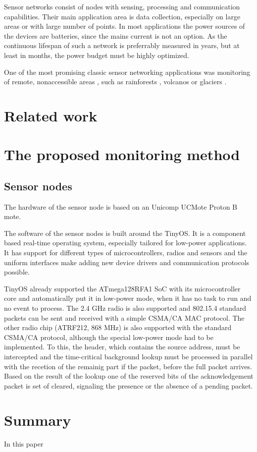 \documentclass[conference]{IEEEtran}
\begin{document}
Sensor networks consist of nodes with sensing, processing and communication
capabilities. Their main application area is data collection, especially
on large areas or with large number of points. In most applications
the power sources of the devices are batteries, since the mains current
is not an option. As the continuous lifespan of such a network is
preferrably measured in years, but at least in months, the power
budget must be highly optimized.

One of the most promising classic sensor networking applications was monitoring
of remote, nonaccessible areas \cite{corke2010}, such as rainforests
\cite{wark2008, cama2013}, volcanos \cite{werner2006, song2009} or glaciers \cite{martinez2004, martinez2005}. 

\section{Related work}

\section{The proposed monitoring method}

\subsection{Sensor nodes}

The hardware of the sensor node is based on an Unicomp UCMote Proton B mote.

The software of the sensor nodes is built around the TinyOS. It is a component
based real-time operating system, especially tailored for low-power applications.
It has support for different types of microcontrollers, radios and sensors and
the uniform interfaces make adding new device drivers and communication protocols possible.

TinyOS already supported the ATmega128RFA1 SoC with its microcontroller core and
automatically put it in low-power mode, when it has no task to run and no event
to process. The 2.4 GHz radio is also supported and 802.15.4 standard packets can
be sent and received with a simple CSMA/CA MAC protocol. The other radio chip
(ATRF212, 868 MHz) is also supported with the standard CSMA/CA protocol, although
the special low-power mode had to be implemented. To this, the header, which contains
the source address, must be intercepted and the time-critical background lookup must be processed in
parallel with the recetion of the remainig part if the packet, before the full packet arrives.
Based on the result of the lookup one of the reserved bits of the acknowledgement
packet is set of cleared, signaling the presence or the absence of a pending packet.

\section{Summary}

In this paper 



\end{document}
